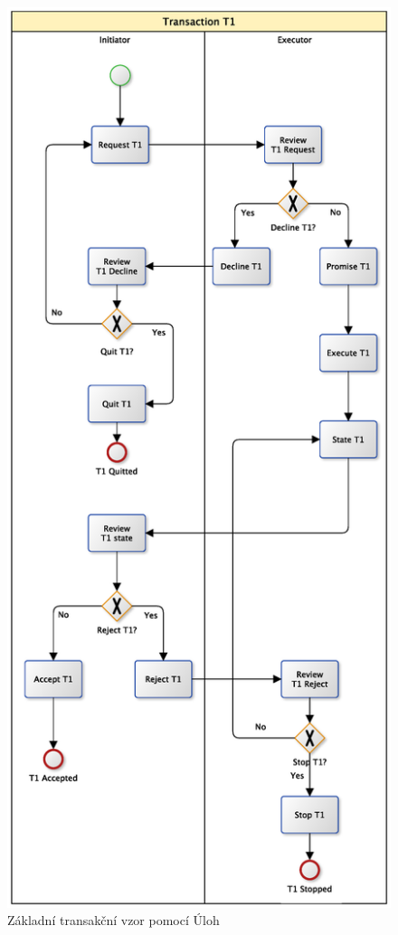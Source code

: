 \documentclass[]{article}
\begin{document}
\begin{figure}[H]\centering
\includegraphics[width=\textwidth,height=\textheight,keepaspectratio]{obrazky/transaction-standard-tasks}
\caption{Základní transakční vzor pomocí Úloh}
\label{fig:Zk_trans_ulohy}
\end{figure}
\end{document}
